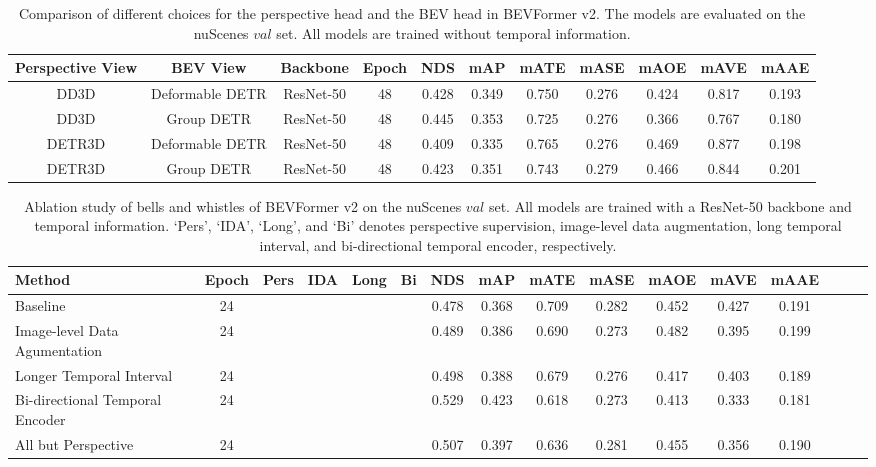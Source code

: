 \documentclass[10pt,twocolumn,letterpaper]{article}
\begin{document}
\setlength{\tabcolsep}{3pt}
\setlength{\doublerulesep}{2\arrayrulewidth}
\renewcommand{\arraystretch}{1.1}
\begin{table*}[ht]
    \caption{Comparison of different choices for the perspective head and the BEV head in BEVFormer v2. The models are evaluated on the nuScenes $val$ set. All models are trained without temporal information.}
    \label{table:detector_choice_for_two_view}
    \centering
    \vspace{-5pt}
    \begin{tabular}{cc|c|c|cc|ccccc}
        \toprule
        Perspective View & BEV View & Backbone & Epoch & NDS & mAP & mATE & mASE & mAOE & mAVE & mAAE   \\ 
        \midrule 
        DD3D & Deformable DETR & ResNet-50 & 48 & 0.428 & 0.349 & 0.750 & 0.276 & 0.424 & 0.817 & 0.193 \\ 
        DD3D & Group DETR & ResNet-50 & 48 & 0.445 & 0.353 & 0.725 & 0.276 & 0.366 & 0.767 & 0.180 \\ 
         DETR3D & Deformable DETR & ResNet-50 & 48 & 0.409 & 0.335 & 0.765 & 0.276 & 0.469 & 0.877 & 0.198 \\ 
        DETR3D & Group DETR & ResNet-50 & 48 & 0.423 & 0.351 & 0.743 & 0.279 & 0.466 & 0.844 & 0.201 \\ 
        \midrule
        \bottomrule
    \end{tabular}
    
\end{table*} \let\ck\checkmark

\setlength{\tabcolsep}{3pt}
\setlength{\doublerulesep}{2\arrayrulewidth}
\renewcommand{\arraystretch}{1.0}
\begin{table*}[t]
    \caption{Ablation study of bells and whistles of BEVFormer v2 on the nuScenes $val$ set. All models are trained with a ResNet-50 backbone and temporal information. `Pers', `IDA', `Long', and `Bi' denotes perspective supervision, image-level data augmentation, long temporal interval, and bi-directional temporal encoder, respectively.}
    \label{table:trick}
    \centering
    \vspace{-5pt}
    \begin{tabular}{l|c|cccc|cc|cc|cccccc}
        \toprule
        Method & Epoch & Pers & IDA & Long & Bi & NDS & mAP & mATE & mASE & mAOE & mAVE & mAAE   \\ 
        \midrule
        Baseline & 24 & \ck & & & & 0.478 & 0.368 & 0.709 & 0.282 & 0.452 & 0.427 & 0.191 \\ 
        Image-level Data Agumentation & 24 & \ck & \ck & & & 0.489 & 0.386 & 0.690 & 0.273 & 0.482 & 0.395 & 0.199 \\
Longer Temporal Interval & 24 & \ck & \ck & \ck & & 0.498 & 0.388 & 0.679 & 0.276 & 0.417 & 0.403 & 0.189 \\
Bi-directional Temporal Encoder & 24 & \ck & \ck & \ck & \ck & 0.529 & 0.423 & 0.618 & 0.273 & 0.413 & 0.333 & 0.181 \\
        All but Perspective & 24 & & \ck & \ck & \ck & 0.507 & 0.397 & 0.636 & 0.281 & 0.455 & 0.356 & 0.190 \\
        \bottomrule
    \end{tabular}
    
\end{table*} 
\end{document}
